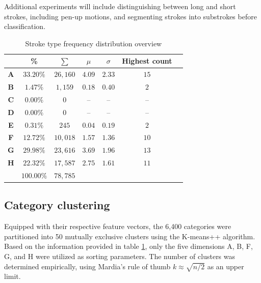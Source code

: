 \documentclass[10pt,conference,a4paper]{IEEEtran}
\begin{document}
	Additional experiments will include distinguishing between long and short strokes,
	including pen-up motions, and segmenting strokes into substrokes before classification.


	\begin{table}[b]
		\renewcommand{\arraystretch}{1.3}
		\caption{Stroke type frequency distribution overview }
		\label{tbl_stroke_analysis}
		\centering
		\begin{tabular}{ c | c c c c c l }
			\hline
			  & \bfseries \% & \small $\sum$ & $\mu$ & $\sigma$ & Highest count \\ 
			\hline
			\hline
			\bfseries A & $33.20\%$ & $26,160$ & $4.09$ & $2.33$ & $15$ & \\%
			\bfseries B & $1.47\%$  & $1,159$  & $0.18$ & $0.40$ & $2$  & \\%
			\bfseries C & $0.00\%$  & $0$      & --     & --     & --   & \\%
			\bfseries D & $0.00\%$  & $0$      & --     & --     & --   & \\%
			\bfseries E & $0.31\%$  & $245$    & $0.04$ & $0.19$ & $2$  & \\%
			\bfseries F & $12.72\%$ & $10,018$ & $1.57$ & $1.36$ & $10$ & \\%
			\bfseries G & $29.98\%$ & $23,616$ & $3.69$ & $1.96$ & $13$ & \\%
			\bfseries H & $22.32\%$ & $17,587$ & $2.75$ & $1.61$ & $11$ & \\%
			\hline
			            & $100.00\%$   & $78,785$ &        &        &      & \\
			\hline
		\end{tabular}
	\end{table}


	\subsection{Category clustering}

	Equipped with their respective feature vectors, the 6,400 categories were partitioned into 50
	mutually exclusive clusters using the K-means++ algorithm. \cite{arthur2007k}
	Based on the information provided
	in table \ref{tbl_stroke_analysis}, only the five dimensions A, B, F, G, and H were utilized as sorting parameters.
	The number of clusters was determined empirically, using Mardia's rule of thumb \mbox{$k \approx \sqrt{n / 2}$} \cite{mardia2005multivariate}
	as an upper limit.
	
\end{document}
